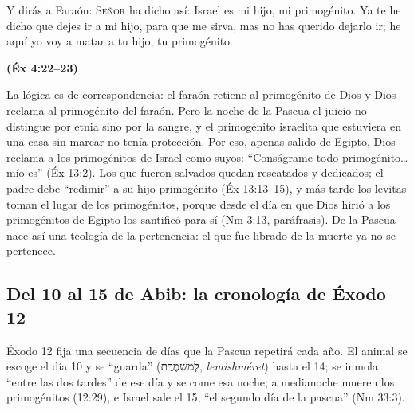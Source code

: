\documentclass[11pt,letterpaper]{article}
\newcommand{\heb}[1]{\mbox{\foreignlanguage{hebrew}{#1}}}
\newcommand{\SENOR}{\textsc{Señor}}
\newcommand{\fuente}[1]{\par\hfill{\upshape\bfseries\small\textcolor{tierraroja}{#1}}}
\begin{document}
\begin{cita}Y dirás a Faraón: \SENOR{} ha dicho así: Israel es mi hijo, mi primogénito. Ya te he dicho que dejes ir a mi hijo, para que me sirva, mas no has querido dejarlo ir; he aquí yo voy a matar a tu hijo, tu primogénito.\fuente{(Éx 4:22--23)}\end{cita}

La lógica es de correspondencia: el faraón retiene al primogénito de Dios y Dios reclama al primogénito del faraón. Pero la noche de la Pascua el juicio no distingue por etnia sino por la sangre, y el primogénito israelita que estuviera en una casa sin marcar no tenía protección. Por eso, apenas salido de Egipto, Dios reclama a los primogénitos de Israel como suyos: ``Conságrame todo primogénito\ldots{} mío es'' (Éx 13:2). Los que fueron salvados quedan rescatados y dedicados; el padre debe ``redimir'' a su hijo primogénito (Éx 13:13--15), y más tarde los levitas toman el lugar de los primogénitos, porque desde el día en que Dios hirió a los primogénitos de Egipto los santificó para sí (Nm 3:13, paráfrasis). De la Pascua nace así una teología de la pertenencia: el que fue librado de la muerte ya no se pertenece.

\subsection{Del 10 al 15 de Abib: la cronología de Éxodo 12}
Éxodo 12 fija una secuencia de días que la Pascua repetirá cada año. El animal se escoge el día 10 y se ``guarda'' (\heb{לְמִשְׁמֶרֶת}, \emph{lemishméret}) hasta el 14; se inmola ``entre las dos tardes'' de ese día y se come esa noche; a medianoche mueren los primogénitos (12:29), e Israel sale el 15, ``el segundo día de la pascua'' (Nm 33:3).
\end{document}
